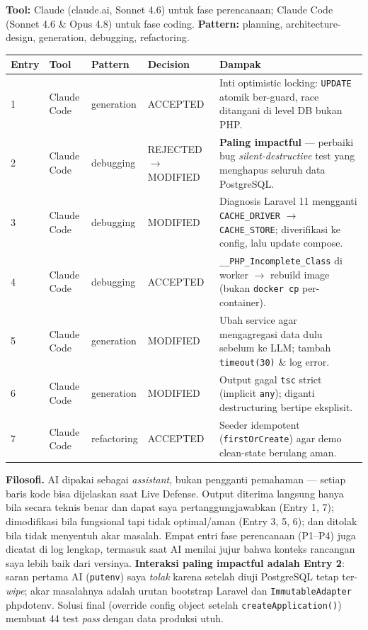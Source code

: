 \documentclass[11pt,a4paper]{article}
\begin{document}
\textbf{Tool:} Claude (claude.ai, Sonnet 4.6) untuk fase perencanaan; Claude Code
(Sonnet 4.6 \& Opus 4.8) untuk fase coding. \textbf{Pattern:} planning,
architecture-design, generation, debugging, refactoring.

\renewcommand{\arraystretch}{1.2}
\begin{table}[h]
\centering
\small
\begin{tabular}{@{}p{0.9cm} p{1.7cm} p{1.9cm} p{2.4cm} p{8.0cm}@{}}
\toprule
\textbf{Entry} & \textbf{Tool} & \textbf{Pattern} & \textbf{Decision} & \textbf{Dampak} \\
\midrule
1 & Claude Code & generation & ACCEPTED & Inti optimistic locking: \texttt{UPDATE} atomik ber-guard, race ditangani di level DB bukan PHP. \\
2 & Claude Code & debugging & REJECTED $\rightarrow$ MODIFIED & \textbf{Paling impactful} --- perbaiki bug \emph{silent-destructive} test yang menghapus seluruh data PostgreSQL. \\
3 & Claude Code & debugging & MODIFIED & Diagnosis Laravel 11 mengganti \texttt{CACHE\_DRIVER} $\rightarrow$ \texttt{CACHE\_STORE}; diverifikasi ke config, lalu update compose. \\
4 & Claude Code & debugging & ACCEPTED & \texttt{\_\_PHP\_Incomplete\_Class} di worker $\rightarrow$ rebuild image (bukan \texttt{docker cp} per-container). \\
5 & Claude Code & generation & MODIFIED & Ubah service agar mengagregasi data dulu sebelum ke LLM; tambah \texttt{timeout(30)} \& log error. \\
6 & Claude Code & generation & MODIFIED & Output gagal \texttt{tsc} strict (implicit \texttt{any}); diganti destructuring bertipe eksplisit. \\
7 & Claude Code & refactoring & ACCEPTED & Seeder idempotent (\texttt{firstOrCreate}) agar demo clean-state berulang aman. \\
\bottomrule
\end{tabular}
\end{table}

\noindent\textbf{Filosofi.} AI dipakai sebagai \emph{assistant}, bukan pengganti pemahaman ---
setiap baris kode bisa dijelaskan saat Live Defense. Output diterima langsung hanya bila
secara teknis benar dan dapat saya pertanggungjawabkan (Entry 1, 7); dimodifikasi bila
fungsional tapi tidak optimal/aman (Entry 3, 5, 6); dan ditolak bila tidak menyentuh akar
masalah. Empat entri fase perencanaan (P1--P4) juga dicatat di log lengkap, termasuk saat AI
menilai jujur bahwa konteks rancangan saya lebih baik dari versinya. \textbf{Interaksi paling
impactful adalah Entry 2}: saran pertama AI (\texttt{putenv}) saya \emph{tolak} karena setelah
diuji PostgreSQL tetap ter-\emph{wipe}; akar masalahnya adalah urutan bootstrap Laravel dan
\texttt{ImmutableAdapter} phpdotenv. Solusi final (override config object setelah
\texttt{createApplication()}) membuat 44 test \emph{pass} dengan data produksi utuh.
\end{document}
